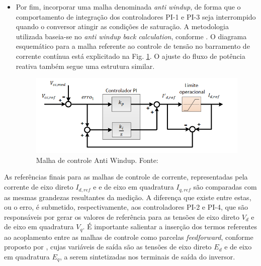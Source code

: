 \begin{itemize}
	\item Por fim, incorporar uma malha denominada \textit{anti windup}, de forma que o comportamento de integração dos controladores PI-1 e PI-3 seja interrompido quando o conversor atingir as condições de saturação. A metodologia utilizada baseia-se no \textit{anti windup back calculation}, conforme \cite{astrom2006advanced}. O diagrama esquemático para a malha referente ao controle de tensão no barramento de corrente contínua está explicitado na Fig. \ref{fig:Malha_anti_windup}. O ajuste do fluxo de potência reativa também segue uma estrutura similar. 
	
	\begin{figure}[!hbt]
		\begin{center}
			\includegraphics[width=0.75\columnwidth]{figuras/Malha_Anti_Windup.PNG}
			\caption{Malha de controle Anti Windup. Fonte: \cite{TeseProfAlex}}
			\label{fig:Malha_anti_windup}
		\end{center}
	\end{figure}
	
	
\end{itemize}

As referências finais para as malhas de controle de corrente, representadas pela corrente de eixo direto $I_{d,ref}$ e  e de eixo em quadratura $I_{q,ref}$ são comparadas com as mesmas grandezas resultantes da medição. A diferença que existe entre estas, ou o erro, é submetido, respectivamente, aos controladores PI-2 e PI-4, que são responsáveis por gerar os valores de referência para as tensões de eixo direto $V_d$ e de eixo em quadratura $V_q$. É importante salientar a inserção dos termos referentes ao acoplamento entre as malhas de controle como parcelas \textit{feedforward}, conforme proposto por \cite{astrom2006advanced}, cujas variáveis de saída são as tensões de eixo direto $E_d$ e de eixo em quadratura $E_q$, a serem sintetizadas nos terminais de saída do inversor. 


